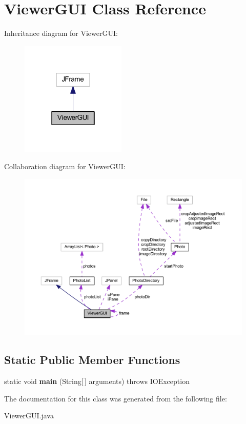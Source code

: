 \hypertarget{class_viewer_g_u_i}{\section{Viewer\-G\-U\-I Class Reference}
\label{class_viewer_g_u_i}
}


Inheritance diagram for Viewer\-G\-U\-I\-:
\nopagebreak
\begin{figure}[H]
\begin{center}
\leavevmode
\includegraphics[width=142pt]{class_viewer_g_u_i__inherit__graph}
\end{center}
\end{figure}


Collaboration diagram for Viewer\-G\-U\-I\-:
\nopagebreak
\begin{figure}[H]
\begin{center}
\leavevmode
\includegraphics[width=350pt]{class_viewer_g_u_i__coll__graph}
\end{center}
\end{figure}
\subsection*{Static Public Member Functions}
\begin{DoxyCompactItemize}
\item 
\hypertarget{class_viewer_g_u_i_a688485c431b6d34895a9958cc2ae57f0}{static void {\bfseries main} (String\mbox{[}$\,$\mbox{]} arguments)  throws I\-O\-Exception }\label{class_viewer_g_u_i_a688485c431b6d34895a9958cc2ae57f0}

\end{DoxyCompactItemize}


The documentation for this class was generated from the following file\-:\begin{DoxyCompactItemize}
\item 
Viewer\-G\-U\-I.\-java\end{DoxyCompactItemize}

